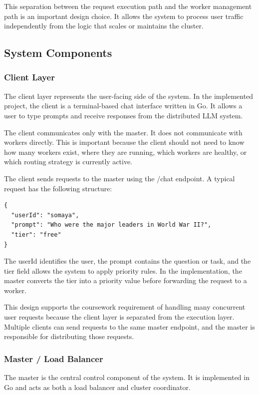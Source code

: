 This separation between the request execution path and the worker management path is an important design choice. It allows the system to process user traffic independently from the logic that scales or maintains the cluster.

\subsection{System Components}
\subsubsection{Client Layer}
The client layer represents the user-facing side of the system. In the implemented project, the client is a terminal-based chat interface written in Go. It allows a user to type prompts and receive responses from the distributed LLM system.

The client communicates only with the master. It does not communicate with workers directly. This is important because the client should not need to know how many workers exist, where they are running, which workers are healthy, or which routing strategy is currently active.

The client sends requests to the master using the /chat endpoint. A typical request has the following structure:

\begin{lstlisting}[language={},basicstyle=\ttfamily\small,frame=single]
{
  "userId": "somaya",
  "prompt": "Who were the major leaders in World War II?",
  "tier": "free"
}
\end{lstlisting}

The userId identifies the user, the prompt contains the question or task, and the tier field allows the system to apply priority rules. In the implementation, the master converts the tier into a priority value before forwarding the request to a worker.

This design supports the coursework requirement of handling many concurrent user requests because the client layer is separated from the execution layer. Multiple clients can send requests to the same master endpoint, and the master is responsible for distributing those requests.

\subsubsection{Master / Load Balancer}
The master is the central control component of the system. It is implemented in Go and acts as both a load balancer and cluster coordinator.

